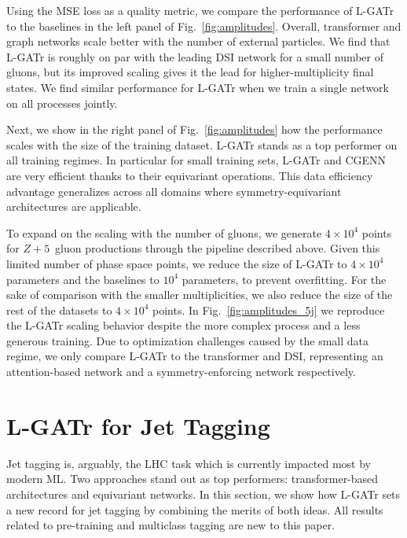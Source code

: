 \documentclass[submission, Phys]{SciPost}
\begin{document}
Using the MSE loss as a quality metric, we compare the performance of L-GATr to the baselines in the left panel of Fig.~\ref{fig:amplitudes}. Overall, transformer and graph networks scale better with the number of external particles. We find that L-GATr is roughly on par with the leading DSI network for a small number of gluons, but its improved scaling gives it the lead for higher-multiplicity final states. We find similar performance for L-GATr when we train a single network on all processes jointly. 

Next, we show in the right panel of Fig.~\ref{fig:amplitudes} how the performance scales with the size of the training dataset. L-GATr stands as a top performer on all training regimes. In particular for small training sets, L-GATr and CGENN are very efficient thanks to their equivariant operations. This data efficiency advantage generalizes across all domains where symmetry-equivariant architectures are applicable.


To expand on the scaling with the number of gluons, we generate $4\times 10^4$ points for $Z+5$~gluon productions through the pipeline described above. Given this limited number of phase space points, we reduce the size of L-GATr to $4\times 10^4$ parameters and the baselines to $10^4$ parameters, to prevent overfitting. For the sake of comparison with the smaller multiplicities, we also reduce the size of the rest of the datasets to $4\times 10^4$ points. In Fig.~\ref{fig:amplitudes_5j} we reproduce the L-GATr scaling behavior despite the more complex process and a less generous training. Due to optimization challenges caused by the small data regime, we only compare L-GATr to the transformer and DSI, representing an attention-based network and a symmetry-enforcing network respectively.

\section{L-GATr for Jet Tagging}
\label{sec:tagging}

Jet tagging is, arguably, the LHC task which is currently impacted most by modern ML. Two approaches stand out as top performers: transformer-based architectures and equivariant networks. In this section, we show how L-GATr sets a new record for jet tagging by combining the merits of both ideas. All results related to pre-training and multiclass tagging are new to this paper.

\end{document}
